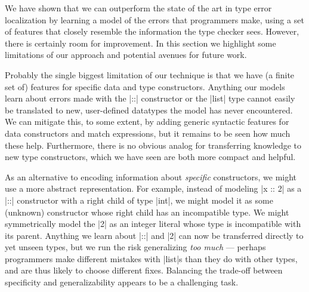 
\label{sec:discussion}

We have shown that we can outperform the state of the art in type error
localization by learning a model of the errors that programmers make,
using a set of features that closely resemble the information the type
checker sees.
%
However, there is certainly room for improvement.
%
In this section we highlight some limitations of our approach and
potential avenues for future work.

\label{sec:limitations}

Probably the single biggest limitation of our technique is that we have
(a finite set of) features for specific data and type constructors.
%
Anything our models learn about errors made with the |::| constructor or
the |list| type cannot easily be translated to new, user-defined
datatypes the model has never encountered.
%
We can mitigate this, to some extent, by adding generic
syntactic features for data constructors and match expressions, but it
remains to be seen how much these help. %
%
Furthermore, there is no obvious analog for transferring knowledge to
new type constructors, which we have seen are both more compact and
helpful.

As an alternative to encoding information about \emph{specific}
constructors, we might use a more abstract representation.
%
For example, instead of modeling |x :: 2| as a |::| constructor with a
right child of type |int|, we might model it as some (unknown) constructor
whose right child has an incompatible type.
%
We might symmetrically model the |2| as an integer literal whose type is
incompatible with its parent.
%
Anything we learn about |::| and |2| can now be transferred directly to
yet unseen types, but we run the risk generalizing \emph{too much} ---
\ie perhaps programmers make different mistakes with |list|s than they
do with other types, and are thus likely to choose different fixes.
%
Balancing the trade-off between specificity and generalizability appears
to be a challenging task.


